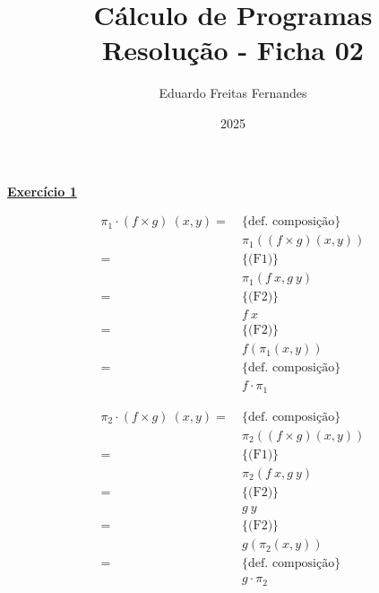 \documentclass[a4paper,11pt]{article}
\title{Cálculo de Programas \\ Resolução - Ficha 02}
\author{Eduardo Freitas Fernandes}
\date{2025}
\begin{document}
	
\maketitle
	
\noindent \underline{\textbf{Exercício 1}}\\

\begin{minipage}{0.45\textwidth}
\begin{mdframed}
	\[
	\begin{aligned}
		\pi_1 \cdot (f \times g) \  (x, y) 
		= \  &\{\text{def. composição}\}\\
		&\pi_1 ((f \times g) (x, y)) \\
		= \  &\{\text{(F1)}\}\\
		&\pi_1 (f \  x, g \  y) \\
		= \  &\{\text{(F2)}\}\\
		&f \  x \\
		= \  &\{\text{(F2)}\}\\
		&f (\pi_1 (x, y)) \\
		= \  &\{\text{def. composição}\}\\
		&f \cdot \pi_1
	\end{aligned}
	\]
\end{mdframed}	
\end{minipage}
\hfill
\begin{minipage}{0.45\textwidth}
\begin{mdframed}
	\[
	\begin{aligned}
		\pi_2 \cdot (f \times g) \  (x, y) 
		= \  &\{\text{def. composição}\}\\
		&\pi_2 ((f \times g) (x, y)) \\
		= \  &\{\text{(F1)}\}\\
		&\pi_2 (f \  x, g \  y) \\
		= \  &\{\text{(F2)}\}\\
		&g \  y \\
		= \  &\{\text{(F2)}\}\\
		&g (\pi_2 (x, y)) \\
		= \  &\{\text{def. composição}\}\\
		&g \cdot \pi_2
	\end{aligned}
	\]
\end{mdframed}
\end{minipage}
\end{document}
